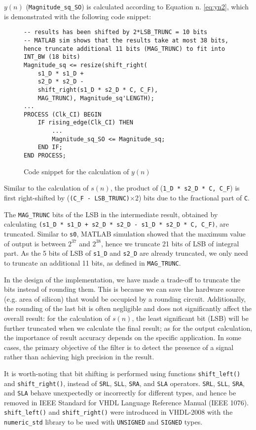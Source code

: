 $y(n)$ (\texttt{Magnitude\_sq\_SO}) is calculated according to Equation n. \ref{eq:yn2}, which is demonstrated with the following code snippet:

\lstset{language=VHDL}
\begin{figure}[H]
\begin{lstlisting}
-- results has been shifted by 2*LSB_TRUNC = 10 bits
-- MATLAB sim shows that the results take at most 38 bits, hence truncate additional 11 bits (MAG_TRUNC) to fit into INT_BW (18 bits)
Magnitude_sq <= resize(shift_right(
    s1_D * s1_D +
    s2_D * s2_D -
    shift_right(s1_D * s2_D * C, C_F),
    MAG_TRUNC), Magnitude_sq'LENGTH);
...
PROCESS (Clk_CI) BEGIN
    IF rising_edge(Clk_CI) THEN
        ...
        Magnitude_sq_SO <= Magnitude_sq;
    END IF;
END PROCESS;
\end{lstlisting}
\caption{Code snippet for the calculation of $y(n)$}
\end{figure}

Similar to the calculation of $s(n)$, the product of (\texttt{1\_D * s2\_D * C, C\_F}) is first right-shifted by (\texttt{(C\_F - LSB\_TRUNC)}$\times 2$)  bits due to the fractional part of \texttt{C}.

The \texttt{MAG\_TRUNC} bits of the LSB in the intermediate result, obtained by calculating \texttt{(s1\_D * s1\_D + s2\_D * s2\_D - s1\_D * s2\_D * C, C\_F)}, are truncated. Similar to \texttt{s0}, MATLAB simulation showed that the maximum value of output is between $2^{37}$ and $2^{38}$, hence we truncate 21 bits of LSB of integral part. As the 5 bits of LSB of \texttt{s1\_D} and \texttt{s2\_D} are already truncated, we only need to truncate an additional 11 bits, as defined in \texttt{MAG\_TRUNC}.

In the design of the implementation, we have made a trade-off to truncate the bits instead of rounding them. This is because we can save the hardware source (e.g. area of silicon) that would be occupied by a rounding circuit. Additionally, the rounding of the last bit is often negligible and does not significantly affect the overall result: for the calculation of $s(n)$, the least significant bit (LSB) will be further truncated when we calculate the final result; as for the output calculation, the importance of result accuracy depends on the specific application. In some cases, the primary objective of the filter is to detect the presence of a signal rather than achieving high precision in the result.

It is worth-noting that bit shifting is performed using functions \texttt{shift\_left()} and \texttt{shift\_right()}, instead of \texttt{SRL}, \texttt{SLL}, \texttt{SRA}, and \texttt{SLA} operators. \texttt{SRL}, \texttt{SLL}, \texttt{SRA}, and \texttt{SLA} behave unexpectedly or incorrectly for different types, and hence be removed in IEEE Standard for VHDL Language Reference Manual (IEEE 1076). \cite{vhdlshift} \texttt{shift\_left()} and \texttt{shift\_right()} were introduced in VHDL-2008 with the \texttt{numeric\_std} library to be used with \texttt{UNSIGNED} and \texttt{SIGNED} types.

